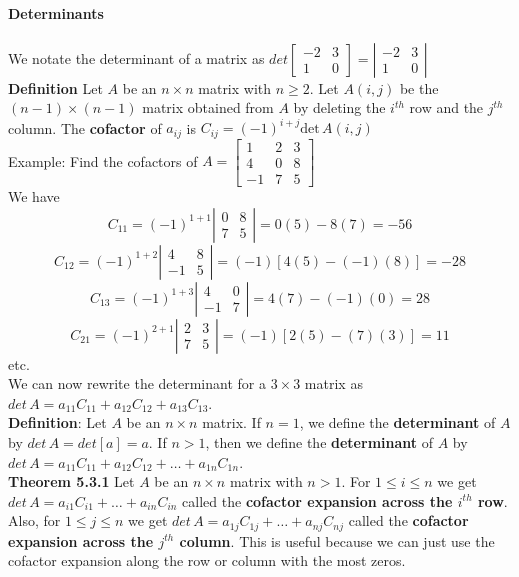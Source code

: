 \documentclass[10pt,letter]{article}
\begin{document}
\paragraph{Determinants} We notate the determinant of a matrix as $det\begin{bmatrix}-2&3\\1&0\end{bmatrix}=\left|\begin{matrix}-2&3\\1&0\end{matrix}\right|$ \\ 
\textbf{Definition} Let $A$ be an $n\times n$ matrix with $n\geq 2$. Let $A(i,j)$ be the $(n-1)\times(n-1)$ matrix obtained from $A$ by deleting the $i^{th}$ row and the $j^{th}$ column. The \textbf{cofactor} of $a_{ij}$ is $C_{ij}=(-1)^{i+j}\text{det}\,A(i,j)$ \\ 
Example: Find the cofactors of $A=\begin{bmatrix}1&2&3\\4&0&8\\-1&7&5\end{bmatrix}$ \\ 
We have $$C_{11}=(-1)^{1+1}\left|\begin{matrix}0&8\\7&5\end{matrix}\right| = 0(5)-8(7)=-56$$ $$C_{12}=(-1)^{1+2}\left|\begin{matrix}4&8\\-1&5\end{matrix}\right|=(-1)[4(5)-(-1)(8)]=-28$$ $$C_{13}=(-1)^{1+3}\left|\begin{matrix}4&0\\-1&7\end{matrix}\right|=4(7)-(-1)(0)=28$$ $$C_{21}=(-1)^{2+1}\left|\begin{matrix}2&3\\7&5\end{matrix}\right|=(-1)[2(5)-(7)(3)]=11$$ etc. \\ 
We can now rewrite the determinant for a $3\times 3$ matrix as $det\,A=a_{11}C_{11}+a_{12}C_{12}+a_{13}C_{13}$. \\ 
\textbf{Definition}: Let $A$ be an $n\times n$ matrix. If $n=1$, we define the \textbf{determinant} of $A$ by $det\,A=det[a]=a$. If $n>1$, then we define the \textbf{determinant} of $A$ by $det\,A=a_{11}C_{11}+a_{12}C_{12}+\ldots+a_{1n}C_{1n}$. \\ 
\textbf{Theorem 5.3.1} Let $A$ be an $n\times n$ matrix with $n>1$. For $1\leq i\leq n$ we get $det\,A=a_{i1}C_{i1}+\ldots+a_{in}C_{in}$ called the \textbf{cofactor expansion across the $i^{th}$ row}. Also, for $1\leq j\leq n$ we get $det\,A=a_{1j}C_{1j}+\ldots+a_{nj}C_{nj}$ called the \textbf{cofactor expansion across the $j^{th}$ column}. This is useful because we can just use the cofactor expansion along the row or column with the most zeros. \\ 
\end{document}
